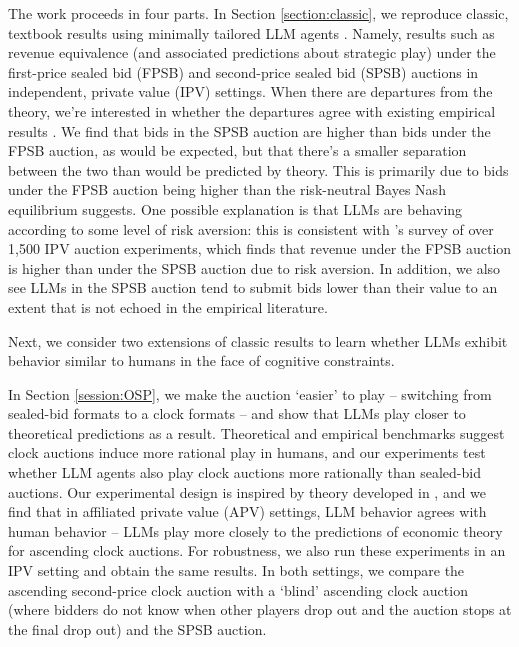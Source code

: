 \documentclass{article} %
\begin{document}
The work proceeds in four parts. 
In Section \ref{section:classic}, we reproduce classic, textbook results using minimally tailored LLM agents \citep{krishna2009auction}. 
Namely, results such as revenue equivalence (and associated predictions about strategic play) under the first-price sealed bid (FPSB) and second-price sealed bid (SPSB) auctions in independent, private value (IPV) settings. 
When there are departures from the theory, we’re interested in whether the departures agree with existing empirical results \citep{kagel2020handbook}. 
We find that bids in the SPSB auction are higher than bids under the FPSB auction, as would be expected, but that there’s a smaller separation between the two than would be predicted by theory. 
This is primarily due to bids under the FPSB auction being higher than the risk-neutral Bayes Nash equilibrium suggests. 
One possible explanation is that LLMs are behaving according to some level of risk aversion: this is consistent with \citet{cox1988theory}'s survey of over 1,500 IPV auction experiments, which finds that revenue under the FPSB auction is higher than under the SPSB auction due to risk aversion. 
In addition, we also see LLMs in the SPSB auction tend to submit bids lower than their value to an extent that is not echoed in the empirical literature. 

Next, we consider two extensions of classic results to learn whether LLMs exhibit behavior similar to humans in the face of cognitive constraints.

In Section \ref{session:OSP}, we make the auction `easier' to play -- switching from sealed-bid formats to a clock formats -- and show that LLMs play closer to theoretical predictions as a result. 
Theoretical and empirical benchmarks suggest clock auctions induce more rational play in humans, and our experiments test whether LLM agents also play clock auctions more rationally than sealed-bid auctions. 
Our experimental design is inspired by theory developed in \citet{li2017obviously}, and we find that in affiliated private value (APV) settings, LLM behavior agrees with human behavior -- LLMs play more closely to the predictions of economic theory for ascending clock auctions. 
For robustness, we also run these experiments in an IPV setting and obtain the same results. 
In both settings, we compare the ascending second-price clock auction with a `blind' ascending clock auction (where bidders do not know when other players drop out and the auction stops at the final drop out) and the SPSB auction. 
\end{document}

